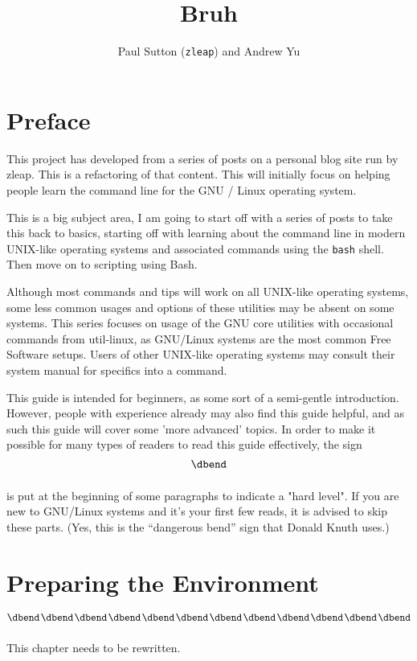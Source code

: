 \documentclass{extbook}
\title{Bruh}
\author{Paul Sutton (\texttt{zleap}) and Andrew Yu}
\begin{document}
\maketitle

\frontmatter
\chapter{Preface}

This project has developed from a series of posts on a personal blog site run by zleap. This is a refactoring of that content.  This will initially focus on helping people learn the command line for the GNU / Linux operating system.

This is a big subject area, I am going to start off with a series of posts to take this back to basics, starting off with learning about the command line in modern UNIX-like operating systems and associated commands using the \texttt{bash} shell.  Then move on to scripting using Bash. 

Although most commands and tips will work on all UNIX-like operating systems, some less common usages and options of these utilities may be absent on some systems.  This series focuses on usage of the GNU core utilities with occasional commands from util-linux, as GNU/Linux systems are the most common Free Software setups.  Users of other UNIX-like operating systems may consult their system manual for specifics into a command.

This guide is intended for beginners, as some sort of a semi-gentle introduction.  However, people with experience already may also find this guide helpful, and as such this guide will cover some 'more advanced' topics.  In order to make it possible for many types of readers to read this guide effectively, the  sign
$$\vbox{\hbox{\dbend}\vskip 11pt}$$
is put at the beginning of some paragraphs to indicate a "hard level".  If you are new to GNU/Linux systems and it's your first few reads, it is advised to skip these parts.  (Yes, this is the ``{dangerous bend}'' sign that Donald Knuth uses.)

\tableofcontents

\mainmatter
\chapter{Preparing the Environment}

$$\vcenter{\hbox{\dbend\kern1pt\dbend\kern1pt\dbend\kern1pt\dbend\kern1pt\dbend\kern1pt\dbend\kern1pt\dbend\kern1pt\dbend\kern1pt\dbend\kern1pt\dbend\kern1pt\dbend\kern1pt\dbend}\vskip 11pt}$$
This chapter needs to be rewritten.
\end{document}

